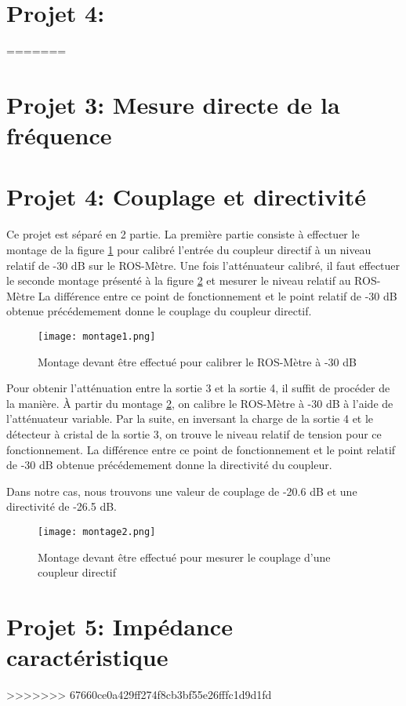 \section{Projet 4: }
=======
\section{Projet 3: Mesure directe de la fréquence}

\section{Projet 4: Couplage et directivité}
Ce projet est séparé en 2 partie. La première partie consiste à effectuer le montage de la figure \ref{montage1} pour calibré l'entrée du coupleur directif à un niveau relatif de -30 dB sur le ROS-Mètre. Une fois l'atténuateur calibré, il faut effectuer le seconde montage présenté à la figure \ref{montage2} et mesurer le niveau relatif au ROS-Mètre La différence entre ce point de fonctionnement et le point relatif de -30 dB obtenue précédemement donne le couplage du coupleur directif.

\begin{figure}[htbp]
    \centering
    \texttt{[image: montage1.png]}
    \caption{Montage devant être effectué pour calibrer le ROS-Mètre à -30 dB}
    \label{montage1}
\end{figure}

Pour obtenir l'atténuation entre la sortie 3 et la sortie 4, il suffit de procéder de la manière. À partir du montage \ref{montage2}, on calibre le ROS-Mètre à -30 dB à l'aide de l'atténuateur variable. Par la suite, en inversant la charge de la sortie 4 et le détecteur à cristal de la sortie 3, on trouve le niveau relatif de tension pour ce fonctionnement. La différence entre ce point de fonctionnement et le point relatif de -30 dB obtenue précédemement donne la directivité du coupleur.

Dans notre cas, nous trouvons une valeur de couplage de -20.6 dB et une directivité de -26.5 dB.

\begin{figure}[htbp]
    \centering
    \texttt{[image: montage2.png]}
    \caption{Montage devant être effectué pour mesurer le couplage d'une coupleur directif}
    \label{montage2}
\end{figure}

\section{Projet 5: Impédance caractéristique}

>>>>>>> 67660ce0a429ff274f8cb3bf55e26fffc1d9d1fd
